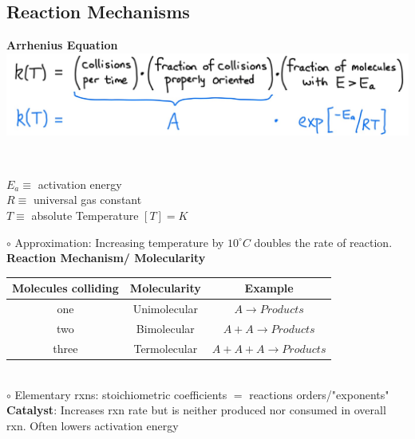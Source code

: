 \subsection{Reaction Mechanisms}
\begin{minipage}{0.65\linewidth}
\textbf{Arrhenius Equation}\\
\includegraphics[width = 0.95\linewidth]{images/Arrhenius_Equation.jpeg}

\begin{minipage}{0.4\linewidth}
    \\
\end{minipage}
\begin{minipage}{0.35\linewidth}
    \begin{center}
        $E_a \equiv$ activation energy\\
        $R \equiv$ universal gas constant\\
        $T \equiv$ absolute Temperature $[T] = K$
    \end{center}
\end{minipage}
$\circ$ Approximation: Increasing temperature by $10 ^{\circ}C$ doubles the rate of reaction.\\
\textbf{Reaction Mechanism/ Molecularity}\\
\begin{tabular}{c|c|c}
     Molecules colliding& Molecularity & Example  \\ \hline
     one & Unimolecular & $A \longrightarrow Products$\\
     two & Bimolecular & $A + A \longrightarrow Products$\\
     three & Termolecular & $A + A + A \longrightarrow Products$
\end{tabular}\\
$\circ$ Elementary rxns: stoichiometric coefficients $=$ reactions orders/"exponents"\\
\textbf{Catalyst}: Increases rxn rate but is neither produced nor consumed in overall rxn. Often lowers activation energy 
\end{minipage}
